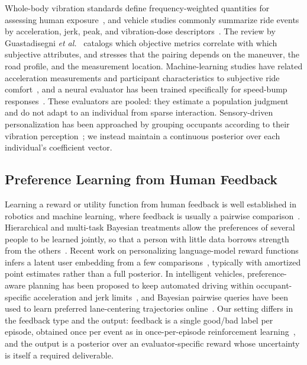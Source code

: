 \documentclass[lettersize,journal]{IEEEtran}
\begin{document}
Whole-body vibration standards define frequency-weighted quantities for assessing human exposure~\cite{iso2631}, and vehicle studies commonly summarize ride events by acceleration, jerk, peak, and vibration-dose descriptors~\cite{elbanhawi2015passenger}. The review by Guastadisegni \emph{et al.}~\cite{guastadisegni2024ride} catalogs which objective metrics correlate with which subjective attributes, and stresses that the pairing depends on the maneuver, the road profile, and the measurement location. Machine-learning studies have related acceleration measurements and participant characteristics to subjective ride comfort~\cite{cieslak2020ride}, and a neural evaluator has been trained specifically for speed-bump responses~\cite{kim2019evaluator}. These evaluators are pooled: they estimate a population judgment and do not adapt to an individual from sparse interaction. Sensory-driven personalization has been approached by grouping occupants according to their vibration perception~\cite{kikuchi2025personalizing}; we instead maintain a continuous posterior over each individual's coefficient vector.

\subsection{Preference Learning from Human Feedback}

Learning a reward or utility function from human feedback is well established in robotics and machine learning, where feedback is usually a pairwise comparison~\cite{christiano2017deep,sadigh2017active}. Hierarchical and multi-task Bayesian treatments allow the preferences of several people to be learned jointly, so that a person with little data borrows strength from the others~\cite{birlutiu2013efficiently}. Recent work on personalizing language-model reward functions infers a latent user embedding from a few comparisons~\cite{poddar2024vpl}, typically with amortized point estimates rather than a full posterior. In intelligent vehicles, preference-aware planning has been proposed to keep automated driving within occupant-specific acceleration and jerk limits~\cite{bae2020robocar}, and Bayesian pairwise queries have been used to learn preferred lane-centering trajectories online~\cite{ran2023online}. Our setting differs in the feedback type and the output: feedback is a single good/bad label per episode, obtained once per event as in once-per-episode reinforcement learning~\cite{chatterji2021once}, and the output is a posterior over an evaluator-specific reward whose uncertainty is itself a required deliverable.
\end{document}

